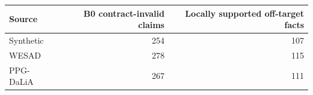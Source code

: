 \begin{tabular}{lrr}
\toprule
Source & B0 contract-invalid claims & Locally supported off-target facts \\
\midrule
Synthetic & 254 & 107 \\
WESAD & 278 & 115 \\
PPG-DaLiA & 267 & 111 \\
\bottomrule
\end{tabular}
